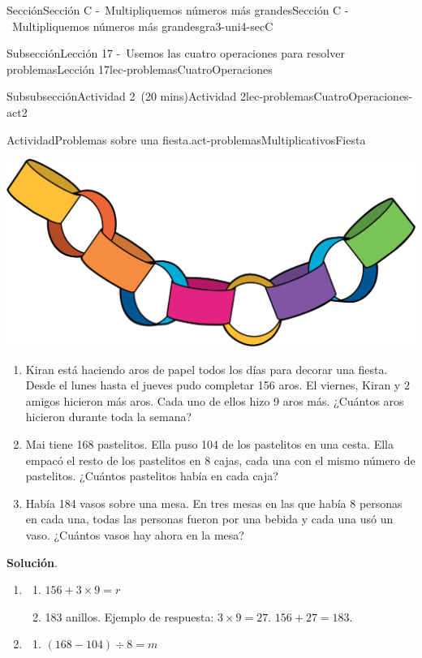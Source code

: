 \documentclass[oneside,10pt,]{article}
\newcommand{\blocktitlefont}{\relax}
\begin{document}
\begin{sectionptx}{Sección}{Sección C -~Multipliquemos números más grandes}{}{Sección C -~Multipliquemos números más grandes}{}{}{gra3-uni4-secC}
\begin{subsectionptx}{Subsección}{Lección 17 -~Usemos las cuatro operaciones para resolver problemas}{}{Lección 17}{}{}{lec-problemasCuatroOperaciones}
\begin{subsubsectionptx}{Subsubsección}{Actividad 2~(20 mins)}{}{Actividad 2}{}{}{lec-problemasCuatroOperaciones-act2}
\begin{activity}{Actividad}{Problemas sobre una fiesta.}{act-problemasMultiplicativosFiesta}
\begin{sidebyside}{2}{0.02}{0}{0.08}
\begin{sbspanel}{0.3}
\includegraphics[width=\linewidth]{external/png-source/CS 3.4 Lesson 17.png}
\end{sbspanel}%
\end{sidebyside}%
%
\begin{enumerate}
\item{}Kiran está haciendo aros de papel todos los días para decorar una fiesta. Desde el lunes hasta el jueves pudo completar 156 aros. El viernes, Kiran y 2 amigos hicieron más aros. Cada uno de ellos hizo 9 aros más. ¿Cuántos aros hicieron durante toda la semana?%
\item{}Mai tiene 168 pastelitos. Ella puso 104 de los pastelitos en una cesta. Ella empacó el resto de los pastelitos en 8 cajas, cada una con el mismo número de pastelitos. ¿Cuántos pastelitos había en cada caja?%
\item{}Había 184 vasos sobre una mesa. En tres mesas en las que había 8 personas en cada una, todas las personas fueron por una bebida y cada una usó un vaso. ¿Cuántos vasos hay ahora en la mesa?%
\end{enumerate}
\par\smallskip%
\noindent\textbf{\blocktitlefont Solución}.\hypertarget{act-problemasMultiplicativosFiesta-3}{}\quad{}%
\begin{enumerate}
\item{}%
\begin{enumerate}
\item{}\(\displaystyle 156 + 3 \times 9 = r\)%
\item{}183 anillos. Ejemplo de respuesta: \(3 \times 9 = 27\). \(156 + 27 = 183\).%
\end{enumerate}
%
\item{}%
\begin{enumerate}
\item{}\(\displaystyle (168 - 104) \div 8 = m\)%

\end{enumerate}
\end{enumerate}
\end{activity}
\end{subsubsectionptx}
\end{subsectionptx}
\end{sectionptx}
\end{document}
